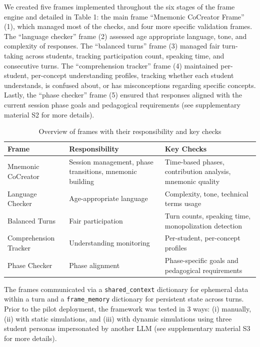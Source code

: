 \documentclass[fleqn,10pt]{wlscirep}
\begin{document}
We created five frames implemented throughout the six stages of the frame engine and detailed in Table 1: the main frame ``Mnemonic CoCreator Frame'' (1), which managed most of the checks, and four more specific validation frames. The ``language checker'' frame (2) assessed age appropriate language, tone, and complexity of responses. The ``balanced turns'' frame (3) managed fair turn-taking across students, tracking participation count, speaking time, and consecutive turns. The ``comprehension tracker'' frame (4) maintained per-student, per-concept understanding profiles, tracking whether each student understands, is confused about, or has misconceptions regarding specific concepts. Lastly, the ``phase checker'' frame (5) ensured that responses aligned with the current session phase goals and pedagogical requirements (see supplementary material S2 for more details).

\begin{table}[H]
\centering
\begin{tabular}{|l|p{5cm}|p{5cm}|}
\hline
\textbf{Frame} & \textbf{Responsibility} & \textbf{Key Checks} \\
\hline
Mnemonic CoCreator & Session management, phase transitions, mnemonic building & Time-based phases, contribution analysis, mnemonic quality \\
\hline
Language Checker & Age-appropriate language & Complexity, tone, technical terms usage \\
\hline
Balanced Turns & Fair participation & Turn counts, speaking time, monopolization detection \\
\hline
Comprehension Tracker & Understanding monitoring & Per-student, per-concept profiles \\
\hline
Phase Checker & Phase alignment & Phase-specific goals and pedagogical requirements \\
\hline
\end{tabular}
\caption{\label{tbl:frames}Overview of frames with their responsibility and key checks}
\end{table}

The frames communicated via a \texttt{shared\_context} dictionary for ephemeral data within a turn and a \texttt{frame\_memory} dictionary for persistent state across turns. Prior to the pilot deployment, the framework was tested in 3 ways: (i) manually, (ii) with static simulations, and (iii) with dynamic simulations using three student personas impersonated by another LLM (see supplementary material S3 for more details).
\end{document}
